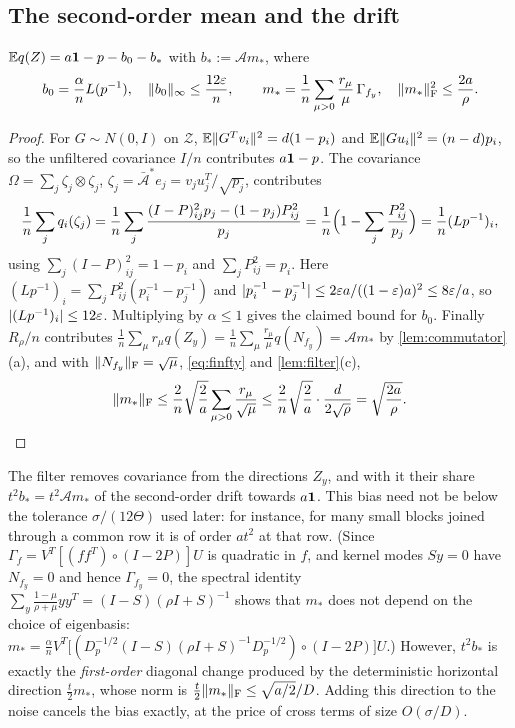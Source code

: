 \subsection{The second-order mean and the drift}

\begin{lemma}[Mean]\label{lem:mean}
$\mathbb E q(Z)=a\mathbf 1-p-b_0-b_*$ with $b_*:=\mathcal Am_*$, where
\[
 b_0=\frac\alpha nL(p^{-1}),\quad \lVert b_0\rVert_\infty\le\frac{12\varepsilon}n,\qquad
 m_*=\frac1n\sum_{\mu>0}\frac{r_\mu}\mu\,\Gamma_{f_y},\quad
 \lVert m_*\rVert_{\mathrm F}^2\le\frac{2a}\rho .
\]
\end{lemma}

\begin{proof}
For $G\sim N(0,I)$ on $\mathcal Z$, $\mathbb E\lVert G^Tv_i\rVert^2=d(1-p_i)$ and
$\mathbb E\lVert Gu_i\rVert^2=(n-d)p_i$, so the unfiltered covariance $I/n$ contributes
$a\mathbf 1-p$. The covariance $\Omega=\sum_j\zeta_j\otimes\zeta_j$, $\zeta_j=\bar{\mathcal
A}^*e_j=v_ju_j^T/\sqrt{p_j}$, contributes
\[
 \frac1n\sum_jq_i(\zeta_j)=\frac1n\sum_j\frac{(I-P)_{ij}^2p_j-(1-p_j)P_{ij}^2}{p_j}
 =\frac1n\Bigl(1-\sum_j\frac{P_{ij}^2}{p_j}\Bigr)=\frac1n(Lp^{-1})_i ,
\]
using $\sum_j(I-P)_{ij}^2=1-p_i$ and $\sum_jP_{ij}^2=p_i$. Here
$(Lp^{-1})_i=\sum_jP_{ij}^2(p_i^{-1}-p_j^{-1})$ and
$|p_i^{-1}-p_j^{-1}|\le2\varepsilon a/((1-\varepsilon)a)^2\le8\varepsilon/a$, so
$|(Lp^{-1})_i|\le12\varepsilon$. Multiplying by $\alpha\le1$ gives the claimed bound for $b_0$. Finally $R_\rho/n$ contributes
$\frac1n\sum_\mu r_\mu q(Z_y)=\frac1n\sum_\mu\frac{r_\mu}\mu q(N_{f_y})=\mathcal
Am_*$ by \cref{lem:commutator}(a), and with $\lVert N_{f_y}\rVert_{\mathrm F}=\sqrt\mu$,
\eqref{eq:finfty} and \cref{lem:filter}(c),
\[
 \lVert m_*\rVert_{\mathrm F}\le\frac2n\sqrt{\frac2a}\sum_{\mu>0}\frac{r_\mu}{\sqrt\mu}
 \le\frac2n\sqrt{\frac2a}\cdot\frac d{2\sqrt\rho}=\sqrt{\frac{2a}\rho}.\qedhere
\]
\end{proof}

\begin{remark}\label{rem:drift}
The filter removes covariance from the directions $Z_y$, and with it their share
$t^2b_*=t^2\mathcal Am_*$ of the second-order drift towards $a\mathbf 1$. This bias
need not be below the tolerance $\sigma/(12\Theta)$ used later: for instance, for
many small blocks joined through a common row it is of order $at^2$ at that row.
(Since $\Gamma_f=V^T[(ff^T)\circ(I-2P)]U$ is quadratic in $f$, and kernel modes
$Sy=0$ have $N_{f_y}=0$ and hence $\Gamma_{f_y}=0$, the spectral identity
$\sum_y\frac{1-\mu}{\rho+\mu}yy^T=(I-S)(\rho I+S)^{-1}$ shows that $m_*$ does not
depend on the choice of eigenbasis:
$m_*=\frac\alpha nV^T\bigl[(D_p^{-1/2}(I-S)(\rho I+S)^{-1}D_p^{-1/2})\circ(I-2P)\bigr]U$.)
However, $t^2b_*$ is exactly the \emph{first-order} diagonal change produced
by the deterministic horizontal direction $\frac t2m_*$, whose norm is
$\frac t2\lVert m_*\rVert_{\mathrm F}\le\sqrt{a/2}/D$. Adding this direction to the noise cancels
the bias exactly, at the price of cross terms of size $O(\sigma/D)$.
\end{remark}

